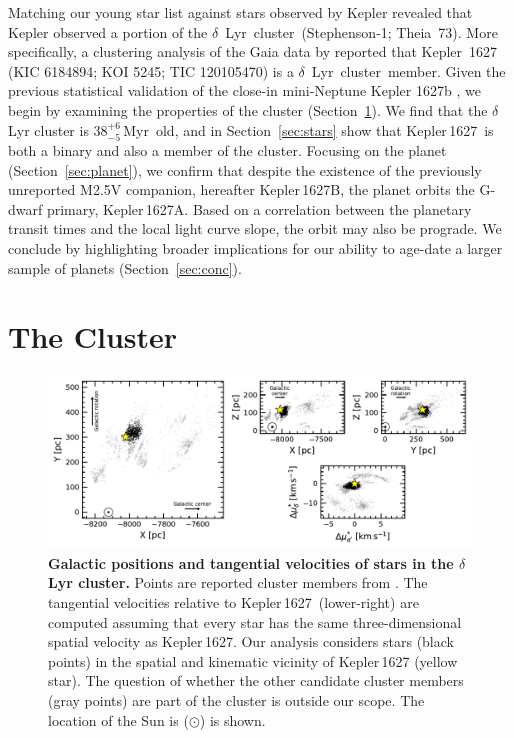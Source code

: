 \documentclass[12pt,modern,twocolumn,tighten]{aastex63}
\newcommand{\cn}{$\delta$\ Lyr\ cluster} %
\newcommand{\sn}{Kepler\,1627} %
\newcommand{\clusterage}{$38^{+6}_{-5}$\,Myr} %
\begin{document}
Matching our young star list against stars observed by Kepler revealed
that Kepler observed a portion of the \cn\ (Stephenson-1; Theia~73).
More specifically, a clustering analysis of the Gaia data by
\citet{KounkelCovey2019} reported that Kepler~1627 (KIC 6184894; KOI
5245; TIC 120105470) is a \cn\ member.  Given the previous statistical
validation of the close-in mini-Neptune Kepler 1627b
\citep{2012ApJS..199...24T,morton_false_2016,thompson_planetary_2018},
we begin by examining the properties of the cluster
(Section~\ref{sec:cluster}).  We find that the $\delta$ Lyr cluster is
\clusterage\ old, and in Section~\ref{sec:stars} show that \sn\ is
both a binary and also a member of the cluster.  Focusing on the
planet (Section~\ref{sec:planet}), we confirm that despite the
existence of the previously unreported M2.5V companion, hereafter
Kepler\,1627B, the planet orbits the G-dwarf primary, Kepler\,1627A.
Based on a correlation between the planetary transit times and the
local light curve slope, the orbit may also be prograde.  We conclude
by highlighting broader implications for our ability to age-date a
larger sample of planets (Section~\ref{sec:conc}).


\section{The Cluster}
\label{sec:cluster}

\begin{figure}[t]
	\begin{center}
		\leavevmode
		\includegraphics[width=1\textwidth]{f1.pdf}
	\end{center}
	\vspace{-0.7cm}
	\caption{
    {\bf Galactic positions and tangential velocities of stars in the
    $\delta$\,Lyr cluster.} Points are reported cluster members from
    \citet{KounkelCovey2019}.  The tangential velocities relative to
    \sn\ (lower-right) are computed assuming that every star has the
    same three-dimensional spatial velocity as \sn.  Our analysis
    considers stars (black points) in the spatial and kinematic
    vicinity of Kepler\,1627 (yellow star).  The question of whether
    the other candidate cluster members (gray points) are part of the
    cluster is outside our scope.  The location of the Sun is
    ($\odot$) is shown.
		\label{fig:XYZvtang}
	}
\end{figure}
\end{document}

